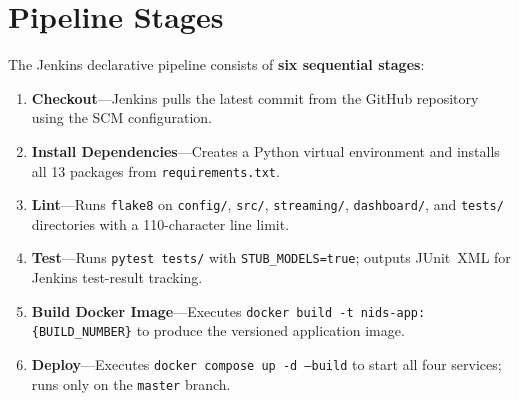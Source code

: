 \documentclass[12pt,a4paper]{report}
\begin{document}
\section{Pipeline Stages}
The Jenkins declarative pipeline consists of \textbf{six sequential stages}:
\begin{enumerate}
  \item \textbf{Checkout}---Jenkins pulls the latest commit from the GitHub
        repository using the SCM configuration.
  \item \textbf{Install Dependencies}---Creates a Python virtual environment
        and installs all 13 packages from \texttt{requirements.txt}.
  \item \textbf{Lint}---Runs \texttt{flake8} on \texttt{config/},
        \texttt{src/}, \texttt{streaming/}, \texttt{dashboard/}, and
        \texttt{tests/} directories with a 110-character line limit.
  \item \textbf{Test}---Runs \texttt{pytest tests/} with
        \texttt{STUB\_MODELS=true}; outputs JUnit~XML for Jenkins test-result
        tracking.
  \item \textbf{Build Docker Image}---Executes
        \texttt{docker build -t nids-app:\{BUILD\_NUMBER\}} to produce the
        versioned application image.
  \item \textbf{Deploy}---Executes \texttt{docker compose up -d --build} to
        start all four services; runs only on the \texttt{master} branch.
\end{enumerate}
\end{document}
